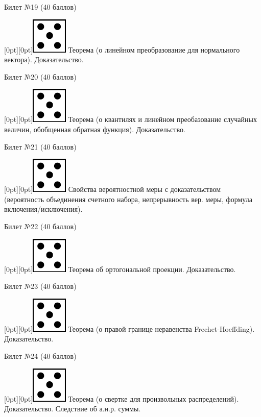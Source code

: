 \documentclass[10pt]{article}
\begin{document}
\begin{center} {\Large Билет №19 (40 баллов)} \end{center}
\raisebox{-1pt}[0pt][0pt]{\includegraphics[width=0.02\linewidth]{5.png}} Теорема (о линейном преобразование для нормального вектора). Доказательство. \\
\begin{center} {\Large Билет №20 (40 баллов)} \end{center}
\raisebox{-1pt}[0pt][0pt]{\includegraphics[width=0.02\linewidth]{5.png}}   Теорема (о квантилях и линейном преобазование случайных величин, обобщенная обратная функция). Доказательство. \\
\begin{center} {\Large Билет №21 (40 баллов)} \end{center}
\raisebox{-1pt}[0pt][0pt]{\includegraphics[width=0.02\linewidth]{5.png}} Свойства  вероятностной меры с доказательством (вероятность объединения счетного набора, непрерывность вер. меры, формула включения/исключения). \\
\begin{center} {\Large Билет №22 (40 баллов)} \end{center}
\raisebox{-1pt}[0pt][0pt]{\includegraphics[width=0.02\linewidth]{5.png}} Теорема об ортогональной проекции. Доказательство. \\
\begin{center} {\Large Билет №23 (40 баллов)} \end{center}
\raisebox{-1pt}[0pt][0pt]{\includegraphics[width=0.02\linewidth]{5.png}} Теорема (о правой границе неравенства Frechet-Hoeffding).  Доказательство. \\
\begin{center} {\Large Билет №24 (40 баллов)} \end{center}
\raisebox{-1pt}[0pt][0pt]{\includegraphics[width=0.02\linewidth]{5.png}} Теорема (о свертке для произвольных распределений). Доказательство. Следствие об а.н.р. суммы. \\ 
\end{document}
